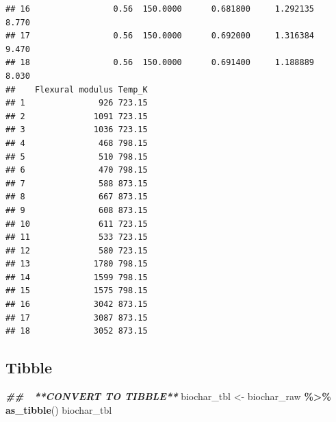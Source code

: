 \documentclass[
]{article}
\newenvironment{Shaded}{\begin{snugshade}}{\end{snugshade}}
\newcommand{\DocumentationTok}[1]{\textcolor[rgb]{0.56,0.35,0.01}{\textbf{\textit{#1}}}}
\newcommand{\FunctionTok}[1]{\textcolor[rgb]{0.13,0.29,0.53}{\textbf{#1}}}
\newcommand{\NormalTok}[1]{#1}
\newcommand{\OtherTok}[1]{\textcolor[rgb]{0.56,0.35,0.01}{#1}}
\newcommand{\SpecialCharTok}[1]{\textcolor[rgb]{0.81,0.36,0.00}{\textbf{#1}}}
\begin{document}
\begin{verbatim}
## 16                 0.56  150.0000      0.681800     1.292135             8.770
## 17                 0.56  150.0000      0.692000     1.316384             9.470
## 18                 0.56  150.0000      0.691400     1.188889             8.030
##    Flexural modulus Temp_K
## 1               926 723.15
## 2              1091 723.15
## 3              1036 723.15
## 4               468 798.15
## 5               510 798.15
## 6               470 798.15
## 7               588 873.15
## 8               667 873.15
## 9               608 873.15
## 10              611 723.15
## 11              533 723.15
## 12              580 723.15
## 13             1780 798.15
## 14             1599 798.15
## 15             1575 798.15
## 16             3042 873.15
## 17             3087 873.15
## 18             3052 873.15
\end{verbatim}

\subsection{Tibble}\label{tibble}

\begin{Shaded}
\begin{Highlighting}[]
\DocumentationTok{\#\# 📘 **CONVERT TO TIBBLE**}
\NormalTok{biochar\_tbl }\OtherTok{\textless{}{-}}\NormalTok{ biochar\_raw }\SpecialCharTok{\%\textgreater{}\%} \FunctionTok{as\_tibble}\NormalTok{()}
\NormalTok{biochar\_tbl}
\end{Highlighting}
\end{Shaded}
\end{document}
